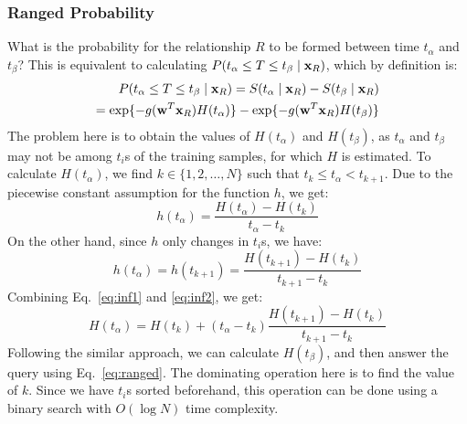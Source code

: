 \subsubsection{Ranged Probability} What is the probability for the relationship $R$ to be formed between time $t_\alpha$ and $t_\beta$? This is equivalent to calculating $P(t_\alpha \le T \le t_\beta \mid \mathbf{x}_R)$, which by definition is:
\begin{equation}\label{eq:ranged}
\begin{split}
P(t_\alpha\le T \le t_\beta \mid \mathbf{x}_R) = S(t_\alpha\mid \mathbf{x}_R) - S(t_\beta\mid \mathbf{x}_R)\\
= \exp\{-g(\mathbf{w}^T\mathbf{x}_R){H}(t_\alpha)\} - \exp\{-g(\mathbf{w}^T\mathbf{x}_R){H}(t_\beta)\}
\end{split}
\end{equation}
The problem here is to obtain the values of ${H}(t_\alpha)$ and ${H}(t_\beta)$, as $t_\alpha$ and $t_\beta$ may not be among $t_i$s of the training samples, for which ${H}$ is estimated. To calculate ${H}(t_\alpha)$, we find $k\in\{1,2,\dots,N\}$ such that $t_k\le t_\alpha < t_{k+1}$.
Due to the piecewise constant assumption for the function $h$, we get:
\begin{equation}\label{eq:inf1}
{h}(t_\alpha)=\frac{{H}(t_\alpha)-{H}(t_k)}{t_\alpha-t_k}
\end{equation} 
On the other hand, since $h$ only changes in $t_i$s, we have:
\begin{equation}\label{eq:inf2}
{h}(t_\alpha)={h}(t_{k+1})=\frac{{H}(t_{k+1})-{H}(t_k)}{t_{k+1}-t_k}
\end{equation}
Combining Eq.~\ref{eq:inf1} and \ref{eq:inf2}, we get:
\begin{equation}\label{eq:inf3}
{H}(t_\alpha)={H}(t_k)+(t_\alpha-t_k)\frac{{H}(t_{k+1})-{H}(t_k)}{t_{k+1}-t_k}
\end{equation}
Following the similar approach, we can calculate ${H}(t_\beta)$, and then answer the query using Eq.~\ref{eq:ranged}. The dominating operation here is to find the value of $k$. Since we have $t_i$s sorted beforehand, this operation can be done using a binary search with $O(\log N)$ time complexity.\\

